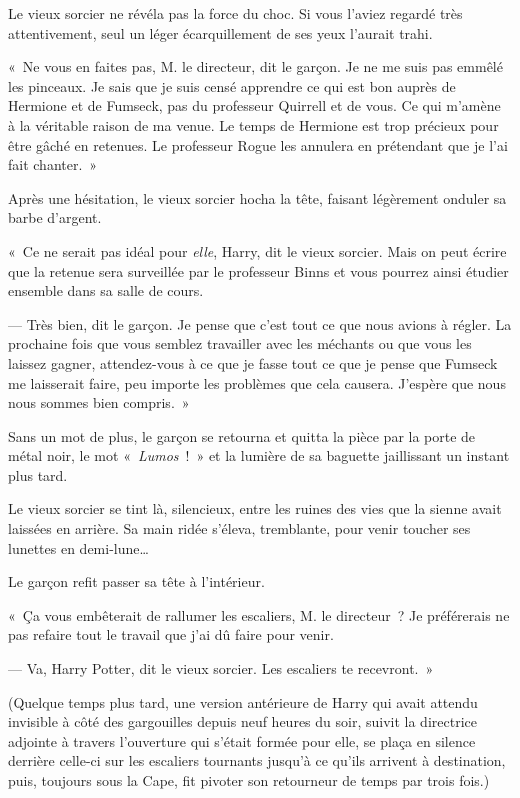Le vieux sorcier ne révéla pas la force du choc.
Si vous l'aviez regardé très attentivement, seul un léger écarquillement de ses yeux l'aurait trahi.

«~Ne vous en faites pas, M. le directeur, dit le garçon.
Je ne me suis pas emmêlé les pinceaux.
Je sais que je suis censé apprendre ce qui est bon auprès de Hermione et de Fumseck, pas du professeur Quirrell et de vous.
Ce qui m'amène à la véritable raison de ma venue.
Le temps de Hermione est trop précieux pour être gâché en retenues.
Le professeur Rogue les annulera en prétendant que je l'ai fait chanter.~»

Après une hésitation, le vieux sorcier hocha la tête, faisant légèrement onduler sa barbe d'argent.

«~Ce ne serait pas idéal pour \emph{elle}, Harry, dit le vieux sorcier.
Mais on peut écrire que la retenue sera surveillée par le professeur Binns et vous pourrez ainsi étudier ensemble dans sa salle de cours.

--- Très bien, dit le garçon.
Je pense que c'est tout ce que nous avions à régler.
La prochaine fois que vous semblez travailler avec les méchants ou que vous les laissez gagner, attendez-vous à ce que je fasse tout ce que je pense que Fumseck me laisserait faire, peu importe les problèmes que cela causera.
J'espère que nous nous sommes bien compris.~»

Sans un mot de plus, le garçon se retourna et quitta la pièce par la porte de métal noir, le mot «~\emph{Lumos}~!~»
et la lumière de sa baguette jaillissant un instant plus tard.

Le vieux sorcier se tint là, silencieux, entre les ruines des vies que la sienne avait laissées en arrière.
Sa main ridée s'éleva, tremblante, pour venir toucher ses lunettes en demi-lune…

Le garçon refit passer sa tête à l'intérieur.

«~Ça vous embêterait de rallumer les escaliers, M. le directeur~?
Je préférerais ne pas refaire tout le travail que j'ai dû faire pour venir.

--- Va, Harry Potter, dit le vieux sorcier.
Les escaliers te recevront.~»

(Quelque temps plus tard, une version antérieure de Harry qui avait attendu invisible à côté des gargouilles depuis neuf heures du soir, suivit la directrice adjointe à travers l'ouverture qui s'était formée pour elle, se plaça en silence derrière celle-ci sur les escaliers tournants jusqu'à ce qu'ils arrivent à destination, puis, toujours sous la Cape, fit pivoter son retourneur de temps par trois fois.)

